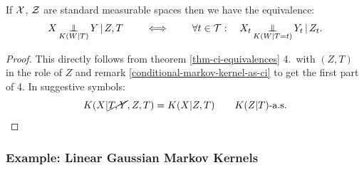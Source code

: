 \begin{Cor}
If $\mathcal{X}$, $\mathcal{Z}$ are standard measurable spaces
then we have the equivalence:
\[ X \operatorname*{\perp\mkern-11mu\perp}_{K(W|T)} Y \operatorname*{|} Z,T \qquad \iff \qquad \forall t \in \mathcal{T}:\quad X_t \operatorname*{\perp\mkern-11mu\perp}_{K(W|T=t)} Y_t \operatorname*{|} Z_t.\]
\begin{proof}
    This directly follows from theorem \ref{thm-ci-equivalences} 4.\ with $(Z,T)$ in the role of $Z$ 
    and remark \ref{conditional-markov-kernel-as-ci} to get the first part of 4.
    In suggestive symbols:
    \[ K(X|\cancel{T,Y},Z,T) = K(X|Z,T) \qquad K(Z|T)\text{-a.s.}\]
\end{proof}
\end{Cor}

\subsubsection{Example: Linear Gaussian Markov Kernels}

